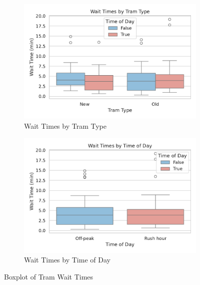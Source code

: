 \documentclass[a4paper, 10pt]{article}
\begin{document}
				\begin{figure}[h!]
					\centering
					\begin{subfigure}[b]{0.48\textwidth}
						\centering
						\includegraphics[width=\textwidth]{Plot_WaitTimesByTramType.pdf}
						\caption{Wait Times by Tram Type}
						\label{fig:wait_time_by_tram_type}
					\end{subfigure}
					\hfill
					\begin{subfigure}[b]{0.48\textwidth}
						\centering
						\includegraphics[width=\textwidth]{Plot_WaitTimesByTimeOfDay.pdf}
						\caption{Wait Times by Time of Day}
						\label{fig:wait_time_by_time_of_day}
					\end{subfigure}
						
					\caption{Boxplot of Tram Wait Times}
					\label{fig:wait_time_boxplots}
				\end{figure}
\end{document}
